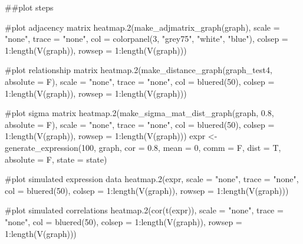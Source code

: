 \documentclass[article, shortnames]{jss}
\begin{document}
\begin{CodeChunk}
\begin{CodeInput}
##plot steps

#plot adjacency matrix
heatmap.2(make\_adjmatrix\_graph(graph), scale = "none", trace = "none", 
          col = colorpanel(3, "grey75", "white", "blue"),
          colsep = 1:length(V(graph)), rowsep = 1:length(V(graph)))

#plot relationship matrix
heatmap.2(make\_distance\_graph(graph\_test4, absolute = F), scale = "none",
          trace = "none", col = bluered(50), colsep = 1:length(V(graph)), 
        rowsep = 1:length(V(graph)))

#plot sigma matrix
heatmap.2(make\_sigma\_mat\_dist\_graph(graph, 0.8, absolute = F), scale = "none", 
          trace = "none", col = bluered(50), colsep = 1:length(V(graph)), 
          rowsep = 1:length(V(graph)))
expr <- generate\_expression(100, graph, cor = 0.8, mean = 0, comm = F, dist = T,
                            absolute = F, state = state)

#plot simulated expression data
heatmap.2(expr, scale = "none", trace = "none", col = bluered(50), 
          colsep = 1:length(V(graph)), rowsep = 1:length(V(graph)))

#plot simulated correlations
heatmap.2(cor(t(expr)), scale = "none", trace = "none", col = bluered(50), 
          colsep = 1:length(V(graph)), rowsep = 1:length(V(graph)))
\end{CodeInput}
\end{CodeChunk}
\end{document}
